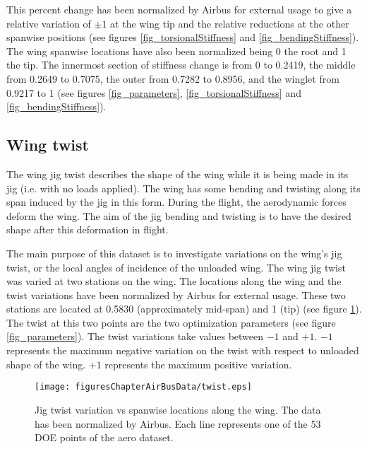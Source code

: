 This percent change has been normalized by Airbus for external usage to give a relative variation of $\pm 1$ at the wing tip and the relative reductions at the other spanwise positions (see figures \ref{fig_torsionalStiffness} and \ref{fig_bendingStiffness}). The wing spanwise locations have also been normalized being 0 the root and 1 the tip. The innermost section of stiffness change is from 0 to 0.2419, the middle from 0.2649 to 0.7075, the outer from 0.7282 to 0.8956, and the winglet from 0.9217 to 1 (see figures \ref{fig_parameters}, \ref{fig_torsionalStiffness} and \ref{fig_bendingStiffness}).

\subsection{Wing twist} \label{sec_wingTwist}

The wing jig twist describes the shape of the wing while it is being made in its jig (i.e. with no loads applied). The wing has some bending and twisting along its span induced by the jig in this form. During the flight, the aerodynamic forces deform the wing. The aim of the jig bending and twisting is to have the desired shape after this deformation in flight. 

The main purpose of this dataset is to investigate variations on the wing’s jig twist, or the local angles of incidence of the unloaded wing. The wing jig twist was varied at two stations on the wing. The locations along the wing and the twist variations have been normalized by Airbus for external usage. These two stations are located at 0.5830 (approximately mid-span) and 1 (tip) (see figure \ref{fig_twist}). The twist at this two points are the two optimization parameters (see figure \ref{fig_parameters}). The twist variations take values between $-1$ and $+1$. $-1$ represents the maximum negative variation on the twist with respect to unloaded shape of the wing. $+1$ represents the maximum positive variation.

\begin{figure}[!htbp]
  \centering
    \texttt{[image: figuresChapterAirBusData/twist.eps]}
  \caption[Jig twist variation vs spanwise locations along the wing]%
{Jig twist variation vs spanwise locations along the wing. The data has been normalized by Airbus. Each line represents one of the 53 DOE points of the aero dataset.}
  \label{fig_twist}
\end{figure}


